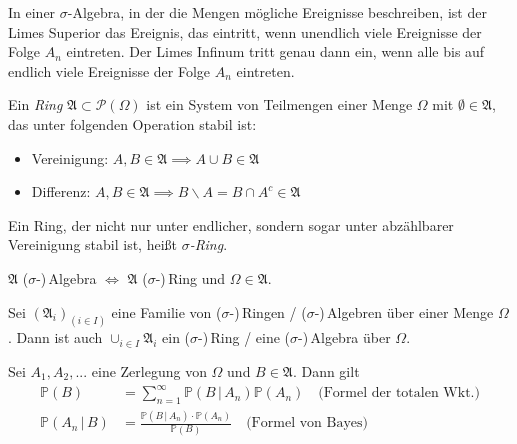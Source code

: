 \documentclass{cheat-sheet}
\newcommand{\Alg}{\mathfrak{A}}
\renewcommand{\P}{\mathbb{P}}
\newcommand{\PD}[2]{\P(#1\,|\,#2)}
\begin{document}
\begin{bem}
  In einer $\sigma$-Algebra, in der die Mengen mögliche Ereignisse beschreiben, ist der Limes Superior das Ereignis, das eintritt, wenn unendlich viele Ereignisse der Folge $A_n$ eintreten. Der Limes Infinum tritt genau dann ein, wenn alle bis auf endlich viele Ereignisse der Folge $A_n$ eintreten.
\end{bem}

\begin{defn}
  Ein \emph{Ring} $\mathfrak{A} \subset \mathcal{P}(\Omega)$ ist ein System von Teilmengen einer Menge $\Omega$ mit $\emptyset \in \mathfrak{A}$, das unter folgenden Operation stabil ist:

  \begin{itemize}
    \item Vereinigung: $A, B \in \mathfrak{A} \implies A \cup B \in \mathfrak{A}$
    \item Differenz: $A, B \in \mathfrak{A} \implies B \backslash A = B \cap A^c \in \mathfrak{A}$
  \end{itemize}

  Ein Ring, der nicht nur unter endlicher, sondern sogar unter abzählbarer Vereinigung stabil ist, heißt \emph{$\sigma$-Ring}.
\end{defn}

\begin{bem}
  $\mathfrak{A}$ ($\sigma$-)\,Algebra $\iff$ $\mathfrak{A}$ ($\sigma$-)\,Ring und $\Omega \in \mathfrak{A}$.
\end{bem}

\begin{satz}
  Sei $(\mathfrak{A}_i)_{(i \in I)}$ eine Familie von ($\sigma$-)\,Ringen / ($\sigma$-)\,Algebren über einer Menge $\Omega$. Dann ist auch $\cup_{i \in I} \mathfrak{A}_i$ ein ($\sigma$-)\,Ring / eine ($\sigma$-)\,Algebra über $\Omega$.
\end{satz}



\begin{satz}
  Sei $A_1, A_2, ...$ eine Zerlegung von $\Omega$ und $B \in \Alg$. Dann gilt
  \begin{align*}
    \P(B) &= \sum_{n=1}^\infty \PD{B}{A_n} \P(A_n) \quad \text{(Formel der totalen Wkt.)}\\
    \PD{A_n}{B} &= \frac{\PD{B}{A_n} \cdot \P(A_n)}{\P(B)} \quad \text{(Formel von Bayes)}
  \end{align*}
\end{satz}
\end{document}
